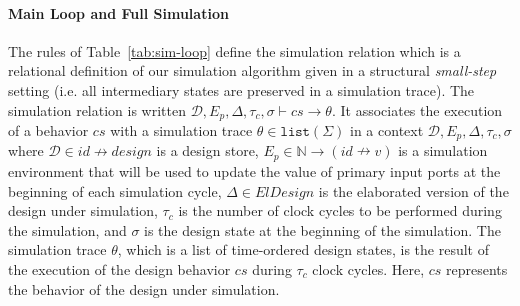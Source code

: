 \documentclass[pdflatex,sn-mathphys]{sn-jnl}%
\theoremstyle{thmstyleone}%
\theoremstyle{thmstyletwo}%
\theoremstyle{thmstylethree}%
\begin{document}

  





\paragraph{Main Loop and Full Simulation}

The rules of Table~\ref{tab:sim-loop} define the \hvhdl{} simulation
relation which is a relational definition of our simulation algorithm
given in a structural \textit{small-step} setting (i.e. all
intermediary states are preserved in a simulation trace).  The
simulation relation is written
$\mathcal{D},E_p,\Delta,\tau_c,\sigma\vdash{}cs\rightarrow\theta$. It
associates the execution of a behavior $cs$ with a simulation trace
$\theta\in\mathtt{list}(\Sigma)$ in a context
$\mathcal{D},E_p,\Delta,\tau_c,\sigma$ where
$\mathcal{D}\in{}id\nrightarrow{}design$ is a design store,
$E_p\in\mathbb{N}\rightarrow(id\nrightarrow{}v)$ is a simulation
environment that will be used to update the value of primary input
ports at the beginning of each simulation cycle, $\Delta\in{}ElDesign$
is the elaborated version of the design under simulation, $\tau_c$ is
the number of clock cycles to be performed during the simulation, and
$\sigma$ is the design state at the beginning of the simulation. The
simulation trace $\theta$, which is a list of time-ordered design
states, is the result of the execution of the design behavior $cs$
during $\tau_c$ clock cycles. Here, $cs$ represents the behavior of the
\hvhdl{} design under simulation.
\end{document}
